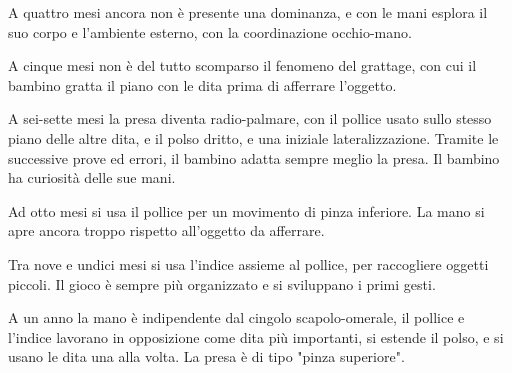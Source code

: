 A quattro mesi ancora non è presente una dominanza, e con le mani esplora il suo corpo e l'ambiente esterno, con la
coordinazione occhio-mano.

A cinque mesi non è del tutto scomparso il fenomeno del grattage, con cui il bambino gratta il piano con le dita prima di
afferrare l'oggetto.

A sei-sette mesi la presa diventa radio-palmare, con il pollice usato sullo stesso piano delle altre dita, e il polso
dritto, e una iniziale lateralizzazione. Tramite le successive prove ed errori, il bambino adatta sempre meglio la presa.
Il bambino ha curiosità delle sue mani.

Ad otto mesi si usa il pollice per un movimento di pinza inferiore. La mano si apre ancora troppo rispetto all'oggetto da
afferrare.

Tra nove e undici mesi si usa l'indice assieme al pollice, per raccogliere oggetti piccoli. Il gioco è sempre più organizzato
e si sviluppano i primi gesti.

A un anno la mano è indipendente dal cingolo scapolo-omerale, il pollice e l'indice lavorano in opposizione come dita più
importanti, si estende il polso, e si usano le dita una alla volta. La presa è di tipo "pinza superiore".
